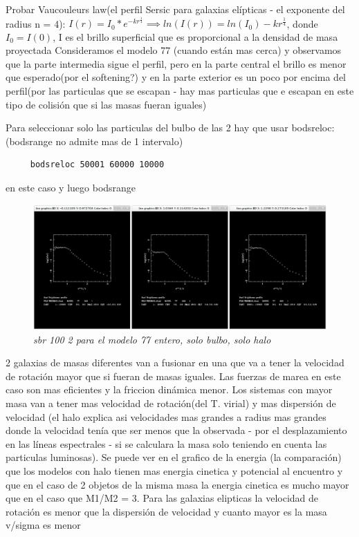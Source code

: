 \documentclass[12pt]{book}
\begin{document}
Probar Vaucouleurs law(el perfil Sersic para galaxias elípticas - el exponente del radius n = 4):
$I(r) = I_0 * e^{-kr^\frac{1}{4}} \implies ln(I(r)) = ln(I_0) - kr^\frac{1}{4}$, donde $I_0 =I(0)$, I es el brillo superficial que es proporcional a la densidad de masa proyectada
Consideramos el modelo 77 (cuando están mas cerca) y observamos que la parte intermedia sigue el perfil, pero en la parte central el brillo es menor que esperado(por el softening?) y en la parte exterior es un poco por encima del perfil(por las particulas que se escapan - hay mas particulas que e escapan en este tipo de colisión que si las masas fueran iguales)

Para seleccionar solo las particulas del bulbo de las 2 hay que usar bodsreloc:(bodsrange no admite mas de 1 intervalo)
\begin{verbatim}
	 bodsreloc 50001 60000 10000
\end{verbatim}
en este caso y luego bodsrange 

\begin{figure}[h!]
 \centering
 \includegraphics[scale=0.2]{sbrCH77-all.png}
 \caption{\emph{sbr 100 2 para el modelo 77 entero, solo bulbo, solo halo}}
 \label{Fig: 5}
\end{figure}


2 galaxias de masas diferentes van a fusionar en una que va a tener la velocidad de rotación mayor que si fueran de masas iguales. Las fuerzas de marea en este caso son mas eficientes y la friccion dinámica menor.
Los sistemas con mayor masa van a tener mas velocidad de rotación(del T. virial) y mas  dispersión de velocidad (el halo explica asi velocidades mas grandes  a radius mas grandes donde la velocidad tenía que ser menos que la observada - por el desplazamiento en las líneas espectrales - si se calculara la masa solo teniendo en cuenta las particulas luminosas).
Se puede ver en el grafico de la energia (la comparación) que los modelos con halo tienen mas energia cinetica y potencial al encuentro y que en el caso de 2 objetos de la misma masa la energia cinetica es mucho mayor que en el caso que M1/M2 = 3.
Para las galaxias elipticas la velocidad de rotación es menor que la dispersión de velocidad y cuanto mayor es la masa v/sigma es menor
\end{document}
